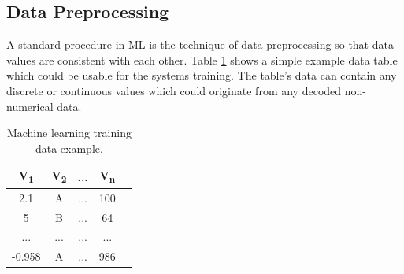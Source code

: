 \documentclass[MGS,Master,english]{twbook}%
\begin{document}
\subsection{Data Preprocessing} \label{ML::dataPreprocessing}
A standard procedure in ML is the technique of data preprocessing so that data values are consistent with each other. Table \ref{table::PCGML::devExample::data} shows a simple example data table which could be usable for the systems training. The table’s data can contain any discrete or continuous values which could originate from any decoded non-numerical data.
\begin{table}[!htbp]
	\centering
	\begin{tabular}{|c|c|c|c|c|}
		\hline
		\textbf{V\textsubscript{1}} & \textbf{V\textsubscript{2}} & \textbf{...} & \textbf{V\textsubscript{n}} \\ \hline\hline
		 2.1         & A           & ...          & 100         \\ \hline
		 5           & B           & ...          & 64          \\ \hline
		 ...         & ...         & ...          & ...         \\ \hline
		-0.958         & A         & ...          & 986         \\ \hline
	\end{tabular}
	\caption{Machine learning training data example.}
	\label{table::PCGML::devExample::data}
\end{table}
\end{document}
